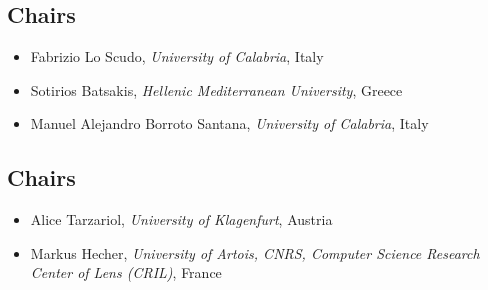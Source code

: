 \documentclass[
]{ceurart}
\begin{document}

\subsection*{Chairs}
\begin{itemize}
\item Fabrizio Lo Scudo, \emph{University of Calabria}, Italy

\item Sotirios Batsakis, \emph{Hellenic Mediterranean University}, Greece

\item Manuel Alejandro Borroto Santana, \emph{University of Calabria}, Italy
\end{itemize}


\subsection*{Chairs}
\begin{itemize}
\item Alice Tarzariol, \emph{University of Klagenfurt}, Austria

\item Markus Hecher, \emph{University of Artois, CNRS, Computer Science Research Center of Lens (CRIL)}, France
\end{itemize}
\end{document}
